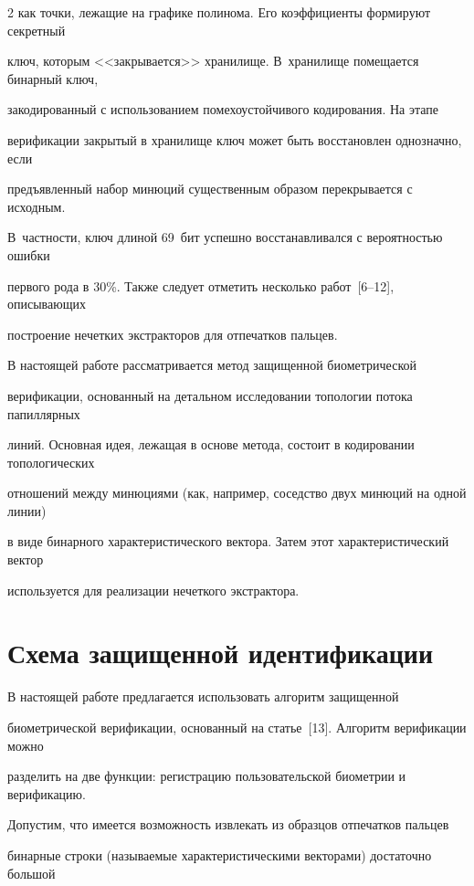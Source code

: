 \begin{multicols}{2}
как точки, лежащие на графике полинома. Его коэффициенты формируют секретный 

ключ, которым <<закрывается>> хранилище. В~хранилище помещается бинарный ключ, 

закодированный с использованием помехоустойчивого кодирования. На этапе 

верификации закрытый в хранилище ключ может быть восстановлен однозначно, если 

предъявленный набор минюций существенным образом перекрывается с исходным. 

В~част\-ности, ключ длиной 69~бит успешно восстанавливался с вероятностью ошибки 

первого рода в 30\%. Также следует отметить несколько работ~[6--12], описывающих 

построение нечетких экстракторов для отпечатков пальцев. 

      

      В настоящей работе рассматривается метод защищенной биометрической 

верификации, основанный на детальном исследовании топологии потока папиллярных 

линий. Основная идея, лежащая в основе метода, состоит в кодировании топологических 

отношений между минюциями (как, например, соседство двух минюций на одной линии) 

в виде бинарного характеристического вектора. Затем этот характеристический вектор 

используется для реализации нечеткого экстрактора.



\section{Схема защищенной идентификации}

      

      В настоящей работе предлагается использовать алгоритм защищенной 

биометрической верификации, основанный на статье~[13]. Алгоритм верификации можно 

разделить на две функции: регистрацию пользовательской биометрии и верификацию.

      

      Допустим, что имеется возможность извлекать из образцов отпечатков пальцев 

бинарные строки (называемые характеристическими векторами) достаточно большой 


\end{multicols}
